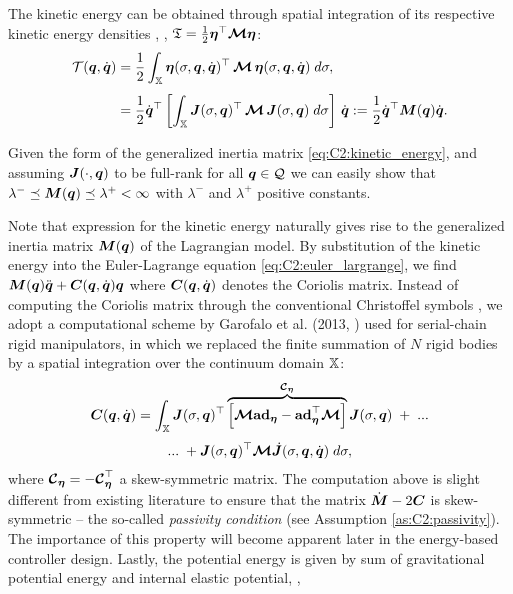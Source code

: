 The kinetic energy can be obtained through spatial integration of its respective kinetic energy densities \cite{Boyer2010,Mochiyama2003,Tatlicioglu2007}, \ie,
$\mathfrak{T} = \frac{1}{2}{\boldsymbol{\eta}}^\top \boldsymbol{\mathcal{M}} {\boldsymbol{\eta}}
$:
%
\begin{align}
\mathcal{T}({{\boldsymbol{q}}},\dot{{{\boldsymbol{q}}}}) & = \frac{1}{2}\int_{\mathbb{X}} {\boldsymbol{\eta}}(\sigma,{{\boldsymbol{q}}},\dot{{\boldsymbol{q}}})^\top\,\boldsymbol{\mathcal{M}}\,{{\boldsymbol{\eta}}}(\sigma,{{\boldsymbol{q}}},\dot{{{\boldsymbol{q}}}}) \; d \sigma,
 \notag \\[0.35em]
& =  \frac{1}{2} \dot{{\boldsymbol{q}}}^\top \left[\int_{\mathbb{X}}  {\boldsymbol{J}}(\sigma,{\boldsymbol{q}})^\top\,\boldsymbol{\mathcal{M}}\, {\boldsymbol{J}}(\sigma,{\boldsymbol{q}}) \; d \sigma \right]\, \dot{{\boldsymbol{q}}} := \frac{1}{2}\dot{{\boldsymbol{q}}}^\top \boldsymbol{M}({\boldsymbol{q}}) \dot{{\boldsymbol{q}}}.
\label{eq:C2:kinetic_energy}
\end{align}
%
\begin{rmk}
Given the form of the generalized inertia matrix  \eqref{eq:C2:kinetic_energy}, and assuming ${\boldsymbol{J}}(\cdot,{\boldsymbol{q}})$ to be full-rank for all ${\boldsymbol{q}} \in \mathcal{Q}$ we can easily show that $\lambda^{-} \preceq \boldsymbol{M}({\boldsymbol{q}}) \preceq \lambda^{+} < \infty$ with $\lambda^{-}$ and $\lambda^{+}$
positive constants.
\end{rmk}
%
Note that expression for the kinetic energy naturally gives rise to the generalized inertia matrix ${\boldsymbol{M}}({\boldsymbol{q}})$ of the Lagrangian model. By substitution of the kinetic energy into the Euler-Lagrange equation \eqref{eq:C2:euler_largrange}, we find ${\boldsymbol{M}}({\boldsymbol{q}}){\ddot{\boldsymbol{q}}} + {\boldsymbol{C}}({\boldsymbol{q}},{\dot{\boldsymbol{q}}}){\boldsymbol{q}}$ where ${\boldsymbol{C}}({\boldsymbol{q}},\dot{{\boldsymbol{q}}})$ denotes the Coriolis matrix. Instead of computing the Coriolis matrix through the conventional Christoffel symbols \cite{Murray1994}, we adopt a computational scheme by Garofalo et al. (2013,
\cite{Garofalo2013}) used for serial-chain rigid manipulators, in which we replaced the finite summation of $N$ rigid bodies by a spatial integration over the continuum domain $\mathbb{X}$:
%
\begin{multline}
\boldsymbol{C}({\boldsymbol{q}},{\dot{\boldsymbol{q}}}) = \int_{\mathbb{X}} {\boldsymbol{J}}(\sigma,{\boldsymbol{q}})^\top \overbrace{\left[\boldsymbol{\mathcal{M}} \textbf{ad}_{{\boldsymbol{\eta}}}  - \textbf{ad}_{{\boldsymbol{\eta}}} ^\top \boldsymbol{\mathcal{M}} \right]}^{\boldsymbol{\mathcal{C}}_{{\boldsymbol{\eta}}}} {\boldsymbol{J}}(\sigma,{\boldsymbol{q}})\; +\; ... \\[0.35em] ...\; + {\boldsymbol{J}}(\sigma,{\boldsymbol{q}})^\top \boldsymbol{\mathcal{M}} \,\,\dot{\!\!{\boldsymbol{J}}}(\sigma,{\boldsymbol{q}},{\dot{\boldsymbol{q}}}) \; d \sigma,
\label{eq:C2:coriolis}
\end{multline}
%
where $\boldsymbol{\mathcal{C}}_{{\boldsymbol{\eta}}} = -\boldsymbol{\mathcal{C}}_{{\boldsymbol{\eta}}}^\top$ a skew-symmetric matrix. The computation above is slight different from existing literature \cite{Boyer2021,Renda2020} to ensure that the matrix $\dot{\boldsymbol{M}} - 2\boldsymbol{C}$ is skew-symmetric -- the so-called \emph{passivity condition} (see Assumption \ref{as:C2:passivity}). The importance of this property will become apparent later in the energy-based controller design. Lastly, the potential energy is given by sum of gravitational potential energy and internal elastic potential, \ie,
